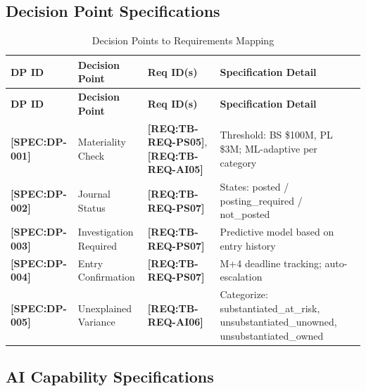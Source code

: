\documentclass[11pt,a4paper]{article}
\newcommand{\reqref}[1]{\textcolor{reqpurple}{\textbf{[REQ:#1]}}}
\newcommand{\specref}[1]{\textcolor{specblue}{\textbf{[SPEC:#1]}}}
\begin{document}
\subsection{Decision Point Specifications}

\begin{longtable}{@{}C{1.5cm}L{3cm}C{2.5cm}L{6.5cm}@{}}
\caption{Decision Points to Requirements Mapping} \\
\toprule
\textbf{DP ID} & \textbf{Decision Point} & \textbf{Req ID(s)} & \textbf{Specification Detail} \\
\midrule
\endfirsthead
\toprule
\textbf{DP ID} & \textbf{Decision Point} & \textbf{Req ID(s)} & \textbf{Specification Detail} \\
\midrule
\endhead
\specref{DP-001} & Materiality Check & \reqref{TB-REQ-PS05}, \reqref{TB-REQ-AI05} & Threshold: BS \$100M, PL \$3M; ML-adaptive per category \\
\specref{DP-002} & Journal Status & \reqref{TB-REQ-PS07} & States: posted / posting\_required / not\_posted \\
\specref{DP-003} & Investigation Required & \reqref{TB-REQ-PS07} & Predictive model based on entry history \\
\specref{DP-004} & Entry Confirmation & \reqref{TB-REQ-PS07} & M+4 deadline tracking; auto-escalation \\
\specref{DP-005} & Unexplained Variance & \reqref{TB-REQ-AI06} & Categorize: substantiated\_at\_risk, unsubstantiated\_unowned, unsubstantiated\_owned \\
\bottomrule
\end{longtable}

\subsection{AI Capability Specifications}
\end{document}
